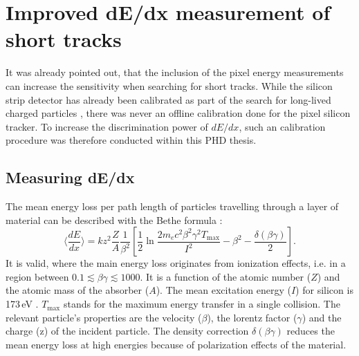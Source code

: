 \section{Improved dE/dx measurement of short tracks}
\label{sec:DeDxMeasurement}
It was already pointed out, that the inclusion of the pixel energy measurements can increase the sensitivity when searching for short tracks.
While the silicon strip detector has already been calibrated as part of the search for long-lived charged particles \cite{bib:CMS:HSCP_8TeV}, there was never an offline calibration done for the pixel silicon tracker.
To increase the discrimination power of $dE/dx$, such an calibration procedure was therefore conducted within this PHD thesis.
 
\subsection{Measuring dE/dx}
\label{sec:sub:MeasuringDeDx}
The mean energy loss per path length of particles travelling through a layer of material can be described with the Bethe formula \cite{bib:Bethe_1930}:
\begin{equation*}
\langle \frac{dE}{dx} \rangle = kz^2\frac{Z}{A}\frac{1}{\beta^2} [ \frac{1}{2} \ln{\frac{2m_e c^2 \beta^2 \gamma^2 T_{\text{max}}}{I^2}} - \beta^2 - \frac{\delta( \beta \gamma )}{2} ].
\end{equation*}
It is valid, where the main energy loss originates from ionization effects, i.e. in a region between $0.1\lesssim\beta\gamma\lesssim 1000$.
It is a function of the atomic number ($Z$) and the atomic mass of the absorber ($A$). 
The mean excitation energy ($I$) for silicon is 173\,eV \cite{bib:NIST}. 
$T_{\text{max}}$ stands for the maximum energy transfer in a single collision.
The relevant particle's properties are the velocity ($\beta$), the lorentz factor ($\gamma$) and the charge (z) of the incident particle.
The density correction $\delta( \beta \gamma )$ reduces the mean energy loss at high energies because of polarization effects of the material.

